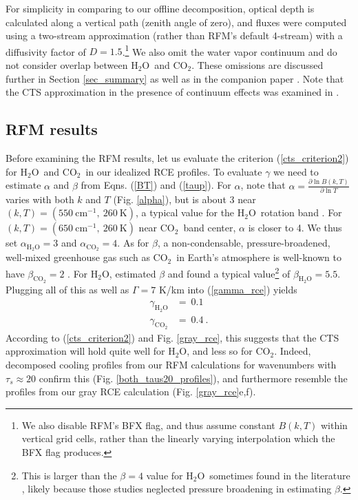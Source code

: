 \documentclass{ametsoc}
\newcommand{\beqn}{\begin{equation}}
\newcommand{\eeqn}{\end{equation}}
\newcommand{\eqnref}[1]{(\ref{#1})}
\newcommand{\Kelvin}{\ensuremath{\mathrm{K}}}
\newcommand{\cminverse}{\ensuremath{\mathrm{cm^{-1}}}}
\newcommand{\partialder}[2]{\ensuremath{\frac{\partial #1}{\partial #2}}}
\newcommand{\cotwo}{\ensuremath{\mathrm{CO_2}}}
\newcommand{\htwo}{\ensuremath{\mathrm{H_2O}}}
\newcommand{\taus}{\ensuremath{\tau_s}}
\begin{document}
 For simplicity in comparing to our offline decomposition, optical depth is calculated along a vertical path (zenith angle of zero), and fluxes   were computed using a two-stream approximation (rather than RFM's default 4-stream) with a diffusivity factor of $D=1.5$.\footnote{We also disable RFM's BFX flag, and thus assume constant $B(k,T)$ within vertical grid cells, rather than the linearly varying interpolation which the BFX flag produces.} We also omit the water vapor continuum and do not consider overlap between \htwo\ and \cotwo. These omissions are discussed further in Section \ref{sec_summary} as well as in the companion paper  \cite{jeevanjee2019a}. Note that the CTS approximation in the presence of continuum effects was examined in \cite{clough1992}.
 

\subsection{RFM results} \label{sec_real_rce}
Before examining the RFM results, let us evaluate the criterion \eqnref{cts_criterion2} for \htwo\ and \cotwo\ in our idealized RCE profiles. To evaluate $\gamma$ we need to estimate $\alpha$ and $\beta$ from Eqns. \eqnref{BT} and \eqnref{taup}. For $\alpha$, note that $\alpha = \partialder{ \ln B(k,T)}{\ln T}$ varies with both $k$ and $T$ (Fig. \ref{alpha}), but is about 3 near $(k,T)=(550\  \cminverse,\ 260\ \Kelvin)$, a typical value for the \htwo\ rotation band \citep[][]{jeevanjee2019a}. For $(k,T)=(650\  \cminverse,\ 260\  \Kelvin)$ near \cotwo\ band center, $\alpha$ is closer to 4.   We thus set $\alpha_{\htwo}=3 $ and $\alpha_{\cotwo}=4$.  As for $\beta$, a non-condensable, pressure-broadened, well-mixed greenhouse gas such as \cotwo\ in Earth's atmosphere is well-known to have $\beta_{\cotwo} = 2$ \citep{pierrehumbert2010}. For \htwo, \cite{jeevanjee2019a} estimated $\beta$ and found a typical value\footnote{This is larger than the $\beta=4$ value for \htwo\ sometimes found in the literature \citep[e.g.][]{frierson2006}, likely because those studies neglected pressure broadening in estimating $\beta$.} of $\beta_{\htwo} = 5.5$. Plugging all of this as well as $\Gamma=7$ K/km into \eqnref{gamma_rce} yields
	\beqn
		\begin{split}
			\gamma_{\htwo}     & =  \  0.1        \\
			\gamma_{\cotwo}   & =  \ 0.4  \ .   		
		\end{split}
	\label{gamma_vals}
	\eeqn
According to \eqnref{cts_criterion2} and Fig. \ref{gray_rce}, this suggests that the CTS approximation will hold quite well for \htwo, and less so for \cotwo. Indeed,  decomposed cooling profiles from our RFM calculations for wavenumbers with $\taus\approx20$  confirm this (Fig. \ref{both_taus20_profiles}), and furthermore resemble the profiles from our gray RCE calculation (Fig. \ref{gray_rce}e,f).
\end{document}
